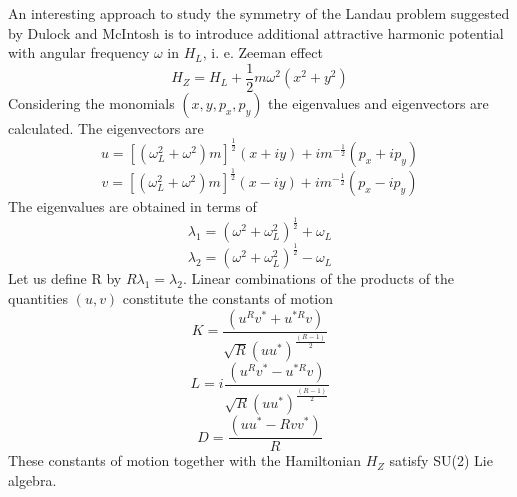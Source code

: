 \documentclass[aps, singlecolumn, showpacs]{revtex4-2}
\begin{document}
An interesting approach to study the symmetry of the Landau problem suggested by Dulock and McIntosh \cite{14} is to introduce additional attractive harmonic potential with angular frequency $\omega$ in $H_L$, i. e. Zeeman effect
\begin{equation}
H_Z = H_L +\frac{1}{2} m \omega^2 (x^2 + y^2)
\end {equation}
Considering the monomials $(x, y, p_x, p_y)$ the eigenvalues and eigenvectors are calculated. The eigenvectors are
\begin{equation}
u = {[(\omega_L^2+\omega^2) m]}^\frac{1}{2} (x+iy) +i m^{-\frac{1}{2}} (p_x +i p_y)
\end{equation}
\begin{equation}
v =  {[(\omega_L^2+\omega^2) m]}^\frac{1}{2} (x-iy) +i m^{-\frac{1}{2}} (p_x -i p_y)
\end{equation}
The eigenvalues are obtained in terms of
\begin{equation}
\lambda_1 = (\omega^2 + \omega_L^2)^\frac{1}{2} + \omega_L
\end{equation}
\begin{equation}
\lambda_2 = (\omega^2 + \omega_L^2)^\frac{1}{2} - \omega_L
\end{equation}
Let us define R by $R\lambda_1 =\lambda_2$. Linear combinations of the products of the quantities $(u, v)$ constitute the constants of motion 
\begin{equation}
K=\frac{(u^R v^* + u^{*R} v)}{\sqrt{R} {(u u^*)}^{\frac{(R-1)}{2}}}
\end{equation}
\begin{equation}
L=i \frac{(u^R v^* - u^{*R} v)}{\sqrt{R} {(u u^*)}^{\frac{(R-1)}{2}}}
\end{equation}
\begin{equation}
D=\frac{(u u^* - R v v^*)}{R}
\end{equation}
These constants of motion together with the Hamiltonian $H_Z$ satisfy SU(2) Lie algebra.
\end{document}
